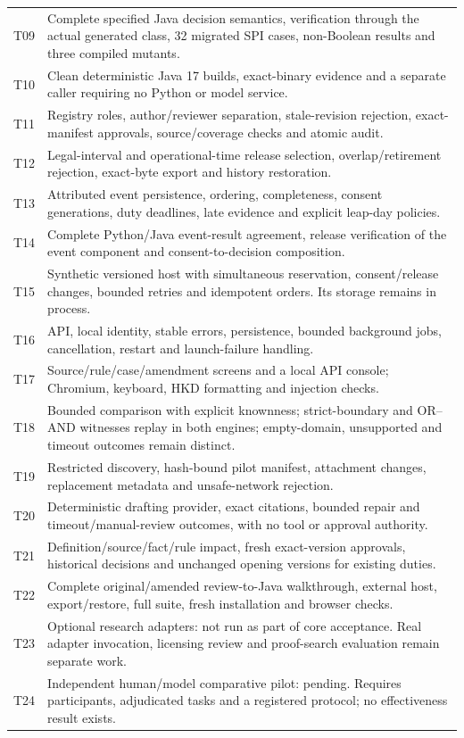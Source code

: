 \documentclass[12pt,a4paper,oneside,openany]{book}
\begin{document}
\begin{longtable}{@{}P{0.09\textwidth}P{0.86\textwidth}@{}}
T09 & Complete specified Java decision semantics, verification through the actual generated class, 32 migrated SPI cases, non-Boolean results and three compiled mutants.\\
T10 & Clean deterministic Java 17 builds, exact-binary evidence and a separate caller requiring no Python or model service.\\
T11 & Registry roles, author/reviewer separation, stale-revision rejection, exact-manifest approvals, source/coverage checks and atomic audit.\\
T12 & Legal-interval and operational-time release selection, overlap/retirement rejection, exact-byte export and history restoration.\\
T13 & Attributed event persistence, ordering, completeness, consent generations, duty deadlines, late evidence and explicit leap-day policies.\\
T14 & Complete Python/Java event-result agreement, release verification of the event component and consent-to-decision composition.\\
T15 & Synthetic versioned host with simultaneous reservation, consent/release changes, bounded retries and idempotent orders. Its storage remains in process.\\
T16 & API, local identity, stable errors, persistence, bounded background jobs, cancellation, restart and launch-failure handling.\\
T17 & Source/rule/case/amendment screens and a local API console; Chromium, keyboard, HKD formatting and injection checks.\\
T18 & Bounded comparison with explicit knownness; strict-boundary and OR--AND witnesses replay in both engines; empty-domain, unsupported and timeout outcomes remain distinct.\\
T19 & Restricted discovery, hash-bound pilot manifest, attachment changes, replacement metadata and unsafe-network rejection.\\
T20 & Deterministic drafting provider, exact citations, bounded repair and timeout/manual-review outcomes, with no tool or approval authority.\\
T21 & Definition/source/fact/rule impact, fresh exact-version approvals, historical decisions and unchanged opening versions for existing duties.\\
T22 & Complete original/amended review-to-Java walkthrough, external host, export/restore, full suite, fresh installation and browser checks.\\
T23 & Optional research adapters: not run as part of core acceptance. Real adapter invocation, licensing review and proof-search evaluation remain separate work.\\
T24 & Independent human/model comparative pilot: pending. Requires participants, adjudicated tasks and a registered protocol; no effectiveness result exists.\\
\bottomrule
\end{longtable}
\endgroup
\end{document}
